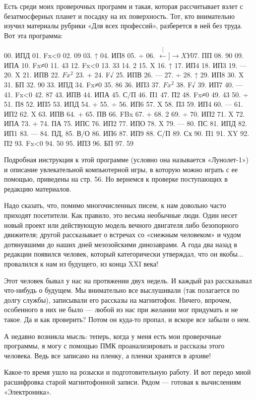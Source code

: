 \documentclass[11pt,a4paper,oneside]{article}
\def\XY{$\stackrel[\leftarrow]{\rightarrow}{XY}$}
\begin{document}
Есть среди моих проверочных программ и такая, которая рассчитывает взлет с безатмосферных планет и посадку на их поверхность. Тот, кто внимательно изучил материалы рубрики «Для всех профессий», разберется в ней без труда. Вот эта программа:

00. ИПД 01. Fx<0 02. 09 03. ↑ 04. ИП8 05. ÷ 06. \XY 07. ПП 08. 90 09. ИПА 10. Fx≠0 11. 43 12. Fx<0 13. 33 14. 2 15. X 16. ↑ 17. ИП4 18. ИП3
19. 	— 20. X 21. ИПВ 22. $Fx^{2}$ 23. + 24. F√ 25. ИПВ 26. — 27. ÷ 28. ↑ 29. ИП8 30. X 31. БП 32. 90
33. 	ИПД 34. Fx≠0 35. 86 36. ИП3 37. $Fx^{2}$ 38. F√ 39. ИП7 40. — 41. Fx<0 42. 87 43. ИПВ 44. ИПА
45. С/П 46. П1 47. П2 48. Fx≠0 49. 43 50. ÷ 51. П8
52. 	ИП5	53.	ИПД 54. + 55. ÷ 56. ИП6 57. X 58. П3
59. ИП4	60.	— 61. ИП2 62. X 63. ИПВ	64.	+ 65. ПВ
66. FBx 67. + 68. 2 69. ÷ 70. ИП2 71. X 72. ИПА
73. 	+ 74. ПА 75. ИПС 76. ИП2 77. ИПО 78. X 79. — 80. ПС 81. ИПД 82. ИП1 83. — 84. ПД, 85. В/О
86. ИП6	87.	ИП9 88. С/П 89. Сх 90. П1 91. XY 92. П2
93. 	Fx<0 94. 50 95. ИПЗ 96. БП 97. 59

Подробная инструкция к этой программе (условно она называется «Лунолет-1») и описание увлекательной компьютерной игры, в которую можно играть с ее помощью, приведены на стр. 56. Но вернемся к проверке поступающих в редакцию материалов.

Надо сказать, что, помимо многочисленных писем, к нам довольно часто приходят посетители. Как правило, это весьма необычные люди. Один несет новый проект или действующую модель вечного двигателя либо безопорного движителя; другой рассказывает о встречах со «снежным человеком» и чудом дотянувшими до наших дней мезозойскими динозаврами. А года два назад в редакции появился человек, который категорически утверждал, что он якобы... провалился к нам из будущего, из конца XXI века!

Этот человек бывал у нас на протяжении двух недель. И каждый раз рассказывал что-нибудь о будущем. Мы внимательно все выслушивали (так полагается по долгу службы), записывали его рассказы на магнитофон. Ничего, впрочем, особенного в них не было — любой из нас при желании мог придумать и не такое. Да и как проверить? Потом он куда-то пропал, и вскоре все забыли о нем.

А недавно возникла мысль: теперь, когда у меня есть мои проверочные программы, я могу с помощью ПМК проанализировать и рассказы этого человека. Ведь все записано на пленку, а пленки хранятся в архиве!

Какое-то время ушло на розыски и подготовительную работу. И вот передо мной расшифровка старой магнитофонной записи. Рядом — готовая к вычислениям «Электроника».
\end{document}
